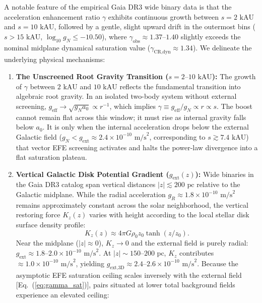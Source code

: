 \documentclass[aps,prd,reprint,superscriptaddress,nofootinbib,floatfix,amsmath,amssymb]{revtex4-2}
\begin{document}
A notable feature of the empirical Gaia DR3 wide binary data is that the acceleration enhancement ratio $\gamma$ exhibits continuous growth between $s = 2\text{ kAU}$ and $s = 10\text{ kAU}$, followed by a gentle, slight upward drift in the outermost bins ($s > 15\text{ kAU}$, $\log_{10} g_N \le -10.50$), where $\gamma_{\text{obs}} \approx 1.37\text{--}1.40$ slightly exceeds the nominal midplane dynamical saturation value ($\gamma_{\text{CR,dyn}} \approx 1.34$). We delineate the underlying physical mechanisms:
\begin{enumerate}
\item \textbf{The Unscreened Root Gravity Transition ($s = 2\text{--}10\text{ kAU}$):} The growth of $\gamma$ between $2\text{ kAU}$ and $10\text{ kAU}$ reflects the fundamental transition into algebraic root gravity. In an isolated two-body system without external screening, $g_{\text{eff}} \to \sqrt{g_N a_0} \propto r^{-1}$, which implies $\gamma \equiv g_{\text{eff}} / g_N \propto r \propto s$. The boost cannot remain flat across this window; it must rise as internal gravity falls below $a_0$. It is only when the internal acceleration drops below the external Galactic field ($g_N < g_{\text{ext}} \approx 2.4 \times 10^{-10}\text{ m/s}^2$, corresponding to $s \gtrsim 7.4\text{ kAU}$) that vector EFE screening activates and halts the power-law divergence into a flat saturation plateau.
\item \textbf{Vertical Galactic Disk Potential Gradient ($g_{\text{ext}}(z)$):} Wide binaries in the Gaia DR3 catalog span vertical distances $|z| \lesssim 200\text{ pc}$ relative to the Galactic midplane. While the radial acceleration $g_R \approx 1.8 \times 10^{-10}\text{ m/s}^2$ remains approximately constant across the solar neighborhood, the vertical restoring force $K_z(z)$ varies with height according to the local stellar disk surface density profile:
\begin{equation}
K_z(z) \approx 4\pi G \rho_0 z_0 \tanh(z / z_0).
\end{equation}
Near the midplane ($|z| \approx 0$), $K_z \to 0$ and the external field is purely radial: $g_{\text{ext}} \approx 1.8\text{--}2.0 \times 10^{-10}\text{ m/s}^2$. At $|z| \sim 150\text{--}200\text{ pc}$, $K_z$ contributes $\approx 1.0 \times 10^{-10}\text{ m/s}^2$, yielding $g_{\text{ext,3D}} \approx 2.4\text{--}2.6 \times 10^{-10}\text{ m/s}^2$. Because the asymptotic EFE saturation ceiling scales inversely with the external field [Eq.~(\ref{eq:gamma_sat})], pairs situated at lower total background fields experience an elevated ceiling:

\end{enumerate}
\end{document}
